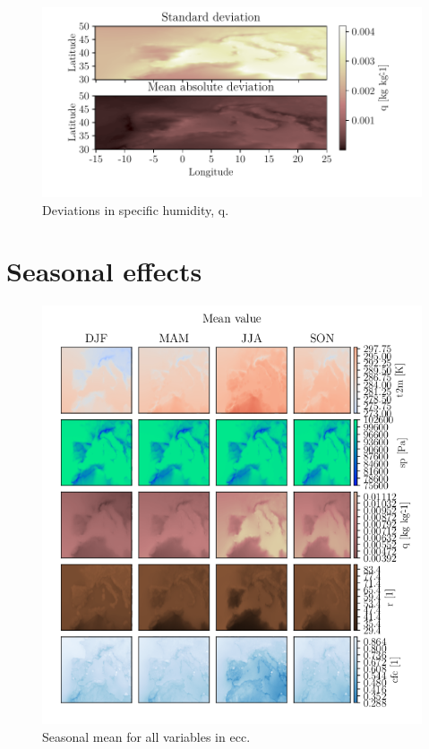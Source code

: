 \begin{figure}[ht]
    \centering
    \includegraphics{python_figs/DEVIATION_all_stat_variable_q.pdf}
    \caption{Deviations in specific humidity, q.}
    \label{fig:deviation_q}
\end{figure}


\cleardoublepage
\chapter{Seasonal effects} \label{app:seasonal_plots}
\begin{figure}[ht]
    \centering
    \includegraphics{python_figs/seasonal_mean_all_variables.png}
    \caption{Seasonal mean for all variables in \acrshort{ecc}.}
    \label{fig:seasonal_mean}
\end{figure}

